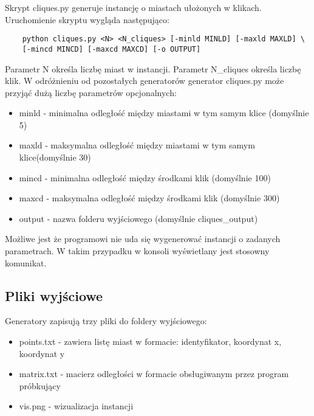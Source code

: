 Skrypt cliques.py generuje instancję o miastach ułożonych w klikach.
Uruchomienie skryptu wygląda następująco:
\begin{lstlisting}
    python cliques.py <N> <N_cliques> [-minld MINLD] [-maxld MAXLD] \ 
    [-mincd MINCD] [-maxcd MAXCD] [-o OUTPUT]
\end{lstlisting}
Parametr N określa liczbę miast w instancji. Parametr N\_cliques określa liczbę klik.
W odróżnieniu od pozostałych generatorów generator cliques.py może przyjąć dużą liczbę parametrów opcjonalnych:
\begin{itemize}
    \item minld - minimalna odległość między miastami w tym samym klice (domyślnie 5)
    \item maxld - maksymalna odległość między miastami w tym samym klice(domyślnie 30)
    \item mincd - minimalna odległość między środkami klik (domyślnie 100)
    \item maxcd - maksymalna odległość między środkami klik (domyślnie 300)
    \item output - nazwa folderu wyjściowego (domyślnie cliques\_output)
\end{itemize}

Możliwe jest że programowi nie uda się wygenerować instancji o zadanych parametrach. W takim przypadku w konsoli wyświetlany jest stosowny komunikat.

\subsection{Pliki wyjściowe}
Generatory zapisują trzy pliki do foldery wyjściowego:
\begin{itemize}
    \item points.txt - zawiera listę miast w formacie: identyfikator, koordynat x, koordynat y
    \item matrix.txt - macierz odległości w formacie obsługiwanym przez program próbkujący
    \item vis.png - wizualizacja instancji
\end{itemize}


